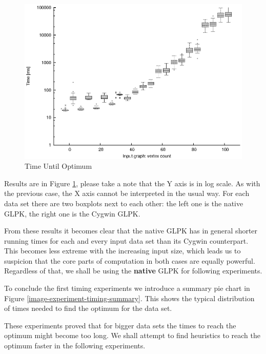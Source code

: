 \begin{figure}
  \caption{Time Until Optimum}
  \label{image-experiment-time-until-optimum}
  \centering
    \includegraphics[width=\textwidth]{images/experiments/time-till-optimum}
\end{figure}

Results are in Figure \ref{image-experiment-time-until-optimum}, please take a note that the Y axis is in log scale. As with the previous case, the X axis cannot be interpreted in the usual way. For each data set there are two boxplots next to each other: the left one is the native GLPK, the right one is the Cygwin GLPK.

From these results it becomes clear that the native GLPK has in general shorter running times for each and every input data set than its Cygwin counterpart. This becomes less extreme with the increasing input size, which leads us to suspicion that the core parts of computation in both cases are equally powerful. Regardless of that, we shall be using the \textbf{native} GLPK for following experiments.

To conclude the first timing experiments we introduce a summary pie chart in Figure \ref{image-experiment-timing-summary}. This shows the typical distribution of times needed to find the optimum for the  data set.

These experiments proved that for bigger data sets the times to reach the optimum might become too long. We shall attempt to find heuristics to reach the optimum faster in the following experiments.

